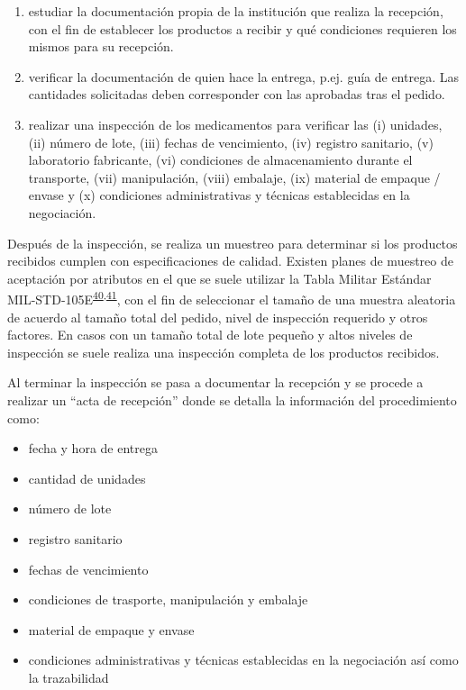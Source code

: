 \documentclass[
]{book}
\begin{document}
\begin{enumerate}
\def\labelenumi{\arabic{enumi}.}
\item
  estudiar la documentación propia de la institución que realiza la recepción, con el fin de establecer los productos a recibir y qué condiciones requieren los mismos para su recepción.
\item
  verificar la documentación de quien hace la entrega, p.ej. guía de entrega. Las cantidades solicitadas deben corresponder con las aprobadas tras el pedido.
\item
  realizar una inspección de los medicamentos para verificar las (i) unidades, (ii) número de lote, (iii) fechas de vencimiento, (iv) registro sanitario, (v) laboratorio fabricante, (vi) condiciones de almacenamiento durante el transporte, (vii) manipulación, (viii) embalaje, (ix) material de empaque / envase y (x) condiciones administrativas y técnicas establecidas en la negociación.
\end{enumerate}

Después de la inspección, se realiza un muestreo para determinar si los productos recibidos cumplen con especificaciones de calidad. Existen planes de muestreo de aceptación por atributos en el que se suele utilizar la Tabla Militar Estándar MIL-STD-105E\textsuperscript{\protect\hyperlink{ref-AmericanNationalStandardsInstitute2013}{40},\protect\hyperlink{ref-GutierrezPulido2008}{41}}, con el fin de seleccionar el tamaño de una muestra aleatoria de acuerdo al tamaño total del pedido, nivel de inspección requerido y otros factores. En casos con un tamaño total de lote pequeño y altos niveles de inspección se suele realiza una inspección completa de los productos recibidos.

Al terminar la inspección se pasa a documentar la recepción y se procede a realizar un ``acta de recepción'' donde se detalla la información del procedimiento como:

\begin{itemize}
\item
  fecha y hora de entrega
\item
  cantidad de unidades
\item
  número de lote
\item
  registro sanitario
\item
  fechas de vencimiento
\item
  condiciones de trasporte, manipulación y embalaje
\item
  material de empaque y envase
\item
  condiciones administrativas y técnicas establecidas en la negociación así como la trazabilidad
\end{itemize}
\end{document}
